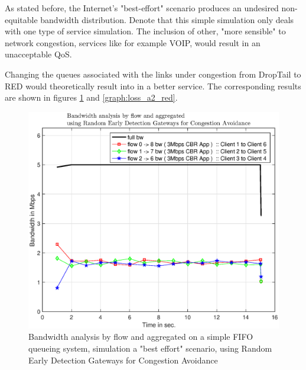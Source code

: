 \documentclass[conference,compsoc]{IEEEtran}
\begin{document}
    As stated before, the Internet's "best-effort" scenario produces an undesired non-equitable bandwidth distribution. Denote that this simple simulation only deals with one type of service simulation. The inclusion of other, "more sensible" to network congestion, services like for example VOIP, would result in an unacceptable QoS.\par
    Changing the queues associated with the links under congestion from DropTail to RED would theoretically result into in a better service. The corresponding results are shown in figures \ref{graph:bw_a2_red} and \ref{graph:loss_a2_red}.
    
    \begin{figure}[H]
    \centering
    \includegraphics[width=1\columnwidth]{EPS/A/bw_a2_red.eps}
    \caption{Bandwidth analysis by flow and aggregated on a simple FIFO queueing system, simulation a "best effort" scenario, using Random Early Detection Gateways for Congestion Avoidance}
    \label{graph:bw_a2_red}
    \end{figure}
    
\end{document}
